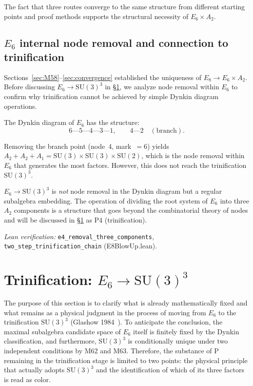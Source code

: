 \documentclass[sn-mathphys-num,Numbered]{sn-jnl}
\theoremstyle{thmstyleone}
\theoremstyle{thmstylethree}
\newcommand{\SU}{\mathrm{SU}}
\begin{document}
The fact that three routes converge to the same structure from different
starting points and proof methods supports the structural necessity of $E_6
\times A_2$.


\subsection{$E_6$ internal node removal and connection to trinification}\label{sec:E6internal}

Sections~\ref{sec:M58}--\ref{sec:convergence} established the uniqueness of
$E_8 \to E_6 \times A_2$.  Before discussing $E_6 \to \SU(3)^3$ in
\S\ref{sec:trinification}, we analyze node removal within $E_6$ to confirm
why trinification cannot be achieved by simple Dynkin diagram operations.

The Dynkin diagram of $E_6$ has the structure:
\begin{equation}\label{eq:E6graph}
  6 \text{---} 5 \text{---} 4 \text{---} 3 \text{---} 1,
  \qquad
  4 \text{---} 2 \quad (\text{branch}).
\end{equation}

Removing the branch point (node~4, mark~$= 6$) yields $A_2 + A_2 + A_1 =
\SU(3) \times \SU(3) \times \SU(2)$, which is the node removal within $E_6$
that generates the most factors.  However, this does not reach the
trinification $\SU(3)^3$.

$E_6 \to \SU(3)^3$ is \emph{not} node removal in the Dynkin diagram but a
regular subalgebra embedding.  The operation of dividing the root system of
$E_6$ into three $A_2$ components is a structure that goes beyond the
combinatorial theory of nodes and will be discussed in
\S\ref{sec:trinification} as P4 (trinification).

\noindent\textit{Lean verification:}
\texttt{e4\_removal\_three\_components},
\texttt{two\_step\_trinification\_chain} (E8BlowUp.lean).


\section{Trinification: $E_6 \to \SU(3)^3$}\label{sec:trinification}

The purpose of this section is to clarify what is already mathematically fixed
and what remains as a physical judgment in the process of moving from $E_6$ to
the trinification $\SU(3)^3$ (Glashow 1984~\cite{Glashow1984}).  To
anticipate the conclusion, the maximal subalgebra candidate space of $E_6$
itself is finitely fixed by the Dynkin classification, and furthermore,
$\SU(3)^3$ is conditionally unique under two independent conditions by M62 and
M63.  Therefore, the substance of P remaining in the trinification stage is
limited to two points: the physical principle that actually adopts $\SU(3)^3$
and the identification of which of its three factors is read as color.
\end{document}
